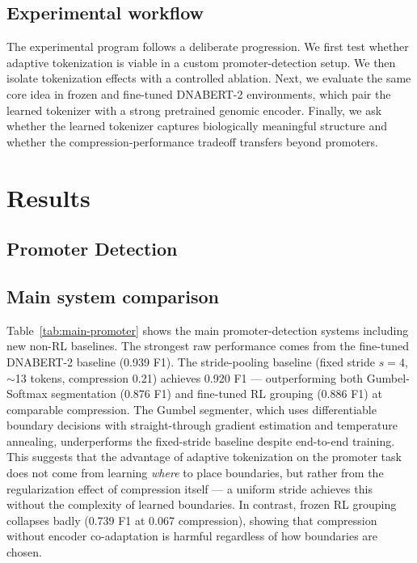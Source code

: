 \documentclass[sigconf,screen]{acmart}
\newcommand{\dnabert}{DNABERT-2\xspace}
\begin{document}
\subsection{Experimental workflow}
The experimental program follows a deliberate progression. We first test whether adaptive tokenization is viable in a custom promoter-detection setup. We then isolate tokenization effects with a controlled ablation. Next, we evaluate the same core idea in frozen and fine-tuned \dnabert environments, which pair the learned tokenizer with a strong pretrained genomic encoder. Finally, we ask whether the learned tokenizer captures biologically meaningful structure and whether the compression-performance tradeoff transfers beyond promoters.

\section{Results}
\subsection{Promoter Detection}
\subsection{Main system comparison}
Table~\ref{tab:main-promoter} shows the main promoter-detection systems including new non-RL baselines. The strongest raw performance comes from the fine-tuned \dnabert baseline (0.939 F1). The stride-pooling baseline (fixed stride $s=4$, $\sim$13 tokens, compression 0.21) achieves 0.920 F1 — outperforming both Gumbel-Softmax segmentation (0.876 F1) and fine-tuned RL grouping (0.886 F1) at comparable compression. The Gumbel segmenter, which uses differentiable boundary decisions with straight-through gradient estimation and temperature annealing, underperforms the fixed-stride baseline despite end-to-end training. This suggests that the advantage of adaptive tokenization on the promoter task does not come from learning \emph{where} to place boundaries, but rather from the regularization effect of compression itself — a uniform stride achieves this without the complexity of learned boundaries. In contrast, frozen RL grouping collapses badly (0.739 F1 at 0.067 compression), showing that compression without encoder co-adaptation is harmful regardless of how boundaries are chosen.
\end{document}
